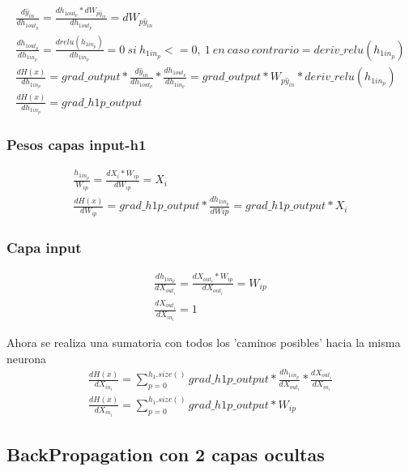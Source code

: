 \begin{gather}
	\frac{d\hat{y}_{in}}{dh_{1out_p}} = \frac{dh_{1out_p} * dW_{p\hat{y}_{in}} }{dh_{1out_p} } = dW_{p\hat{y}_{in}} \\
	\frac{dh_{1out_p} }{dh_{1in_p} } = \frac{drelu(h_{1in_p} )}{dh_{1in_p} } = 0\ si\ h_{1in_p} <= 0,\ 1\ en\ caso\ contrario = deriv\_relu(h_{1in_p}) \\
	\frac{dH(x) }{dh_{1in_p} } = grad\_output* \frac{d\hat{y}_{in} }{dh_{1{out}_p} } * \frac{dh_{1out_p} }{dh_{1in_p} } = grad\_output * W_{p\hat{y}_{in} } * deriv\_relu(h_{1in_p}) \\
	\frac{dH(x) }{dh_{1in_p} } = grad\_h1p\_output
\end{gather}

\subsubsection{Pesos capas input-h1}

\begin{gather}
	\frac{h_{1in_p} }{W_{ip} } = \frac{dX_i * W_{ip} }{dW_{ip} } = X_i \\
	\frac{dH(x) }{dW_{ip} } = grad\_h1p\_output * \frac{dh_{1in_p} }{dW{ip} } = grad\_h1p\_output * X_i
\end{gather}


\subsubsection{Capa input}

\begin{gather}
	\frac{dh_{1in_p} }{dX_{out_i} } = \frac{dX_{out_i} * W_{ip} }{dX_{out_i} } = W_{ip} \\
	\frac{dX_{out_i} }{dX_{in_i} } = 1
\end{gather}

Ahora se realiza una sumatoria con todos los 'caminos posibles' hacia la misma neurona
\begin{gather}
	\frac{dH(x) }{dX_{in_i} } = \sum_{p=0}^{h_1.size()} grad\_h1p\_output * \frac{dh_{1in_p} }{dX_{out_i} } * \frac{dX_{out_i} }{dX_{in_i} }  \\
	\frac{dH(x) }{dX_{in_i} } = \sum_{p=0}^{h_1.size()}  grad\_h1p\_output * W_{ip}
\end{gather}

\subsection{BackPropagation con 2 capas ocultas}
